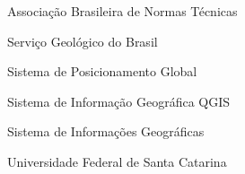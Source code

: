 \begin{siglas}
  \item[ABNT] Associação Brasileira de Normas Técnicas
  \item[CPRM] Serviço Geológico do Brasil
  \item[GPS] Sistema de Posicionamento Global
  \item[QGIS] Sistema de Informação Geográfica QGIS
  \item[SIG] Sistema de Informações Geográficas
  \item[UFSC] Universidade Federal de Santa Catarina
\end{siglas}
\cleardoublepage
